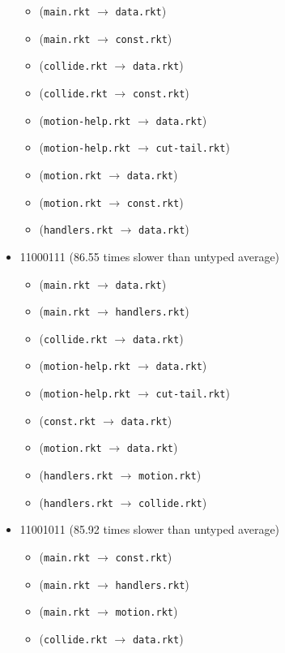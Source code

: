 \documentclass{article}
\newcommand{\mono}[1]{\texttt{#1}}
\begin{document}
\begin{itemize}
  \begin{itemize}
  \item (\mono{main.rkt} $\rightarrow$ \mono{data.rkt})
  \item (\mono{main.rkt} $\rightarrow$ \mono{const.rkt})
  \item (\mono{collide.rkt} $\rightarrow$ \mono{data.rkt})
  \item (\mono{collide.rkt} $\rightarrow$ \mono{const.rkt})
  \item (\mono{motion-help.rkt} $\rightarrow$ \mono{data.rkt})
  \item (\mono{motion-help.rkt} $\rightarrow$ \mono{cut-tail.rkt})
  \item (\mono{motion.rkt} $\rightarrow$ \mono{data.rkt})
  \item (\mono{motion.rkt} $\rightarrow$ \mono{const.rkt})
  \item (\mono{handlers.rkt} $\rightarrow$ \mono{data.rkt})
  \end{itemize}
\item 11000111 (86.55 times slower than untyped average)
  \begin{itemize}
  \item (\mono{main.rkt} $\rightarrow$ \mono{data.rkt})
  \item (\mono{main.rkt} $\rightarrow$ \mono{handlers.rkt})
  \item (\mono{collide.rkt} $\rightarrow$ \mono{data.rkt})
  \item (\mono{motion-help.rkt} $\rightarrow$ \mono{data.rkt})
  \item (\mono{motion-help.rkt} $\rightarrow$ \mono{cut-tail.rkt})
  \item (\mono{const.rkt} $\rightarrow$ \mono{data.rkt})
  \item (\mono{motion.rkt} $\rightarrow$ \mono{data.rkt})
  \item (\mono{handlers.rkt} $\rightarrow$ \mono{motion.rkt})
  \item (\mono{handlers.rkt} $\rightarrow$ \mono{collide.rkt})
  \end{itemize}
\item 11001011 (85.92 times slower than untyped average)
  \begin{itemize}
  \item (\mono{main.rkt} $\rightarrow$ \mono{const.rkt})
  \item (\mono{main.rkt} $\rightarrow$ \mono{handlers.rkt})
  \item (\mono{main.rkt} $\rightarrow$ \mono{motion.rkt})
  \item (\mono{collide.rkt} $\rightarrow$ \mono{data.rkt})

\end{itemize}
\end{itemize}
\end{document}
